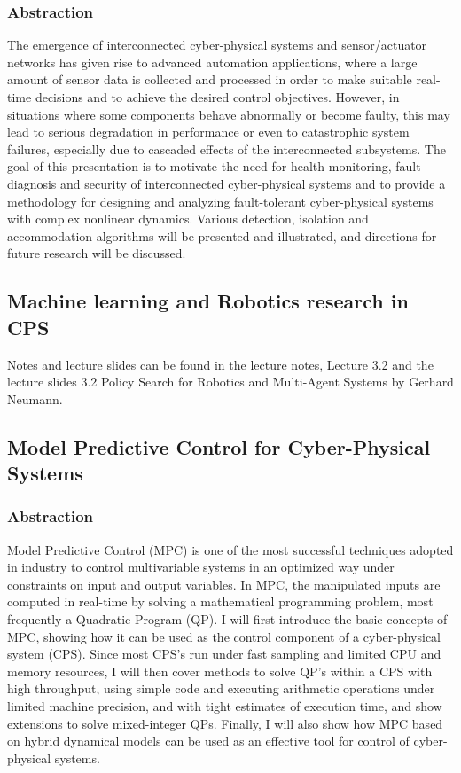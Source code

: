 \documentclass[9pt, english, a4paper]{article}
\theoremstyle{definition}
\begin{document}
	\subsubsection{Abstraction}
	The emergence of interconnected cyber-physical systems and sensor/actuator networks has given rise to advanced automation applications, where a large amount of sensor data is collected and processed in order to make suitable real-time decisions and to achieve the desired control objectives. However, in situations where some components behave abnormally or become faulty, this may lead to serious degradation in performance or even to catastrophic system failures, especially due to cascaded effects of the interconnected subsystems. The goal of this presentation is to motivate the need for health monitoring, fault diagnosis and security of interconnected cyber-physical systems and to provide a methodology for designing and analyzing fault-tolerant cyber-physical systems with complex nonlinear dynamics. Various detection, isolation and accommodation algorithms will be presented and illustrated, and directions for future research will be discussed. 
\subsection{Machine learning and Robotics research in CPS}
		Notes and lecture slides can be found in the lecture notes, Lecture 3.2 and the lecture slides 3.2 Policy Search for Robotics and Multi-Agent Systems by Gerhard Neumann.

\subsection{Model Predictive Control for Cyber-Physical Systems}
	\subsubsection{Abstraction}
Model Predictive Control (MPC) is one of the most successful techniques adopted in industry to control multivariable systems in an optimized way under constraints on input and output variables. In MPC, the manipulated inputs are computed in real-time by solving a mathematical programming problem, most frequently a Quadratic Program (QP). I will first introduce the basic concepts of MPC, showing how it can be used as the control component of a cyber-physical system (CPS). Since most CPS's run under fast sampling and limited CPU and memory resources, I will then cover methods to solve QP's within a CPS with high throughput, using simple code and executing arithmetic operations under limited machine precision, and with tight estimates of execution time, and show extensions to solve mixed-integer QPs. Finally, I will also show how MPC based on hybrid dynamical models can be used as an effective tool for control of cyber-physical systems.
\end{document}
